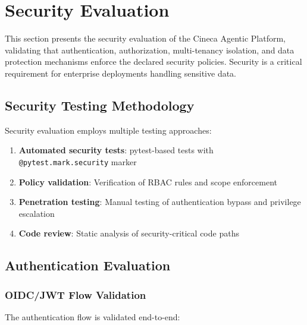 
\section{Security Evaluation}
\label{sec:security-eval}

This section presents the security evaluation of the Cineca Agentic Platform, validating that authentication, authorization, multi-tenancy isolation, and data protection mechanisms enforce the declared security policies. Security is a critical requirement for enterprise deployments handling sensitive data.

\subsection{Security Testing Methodology}

Security evaluation employs multiple testing approaches:

\begin{enumerate}
    \item \textbf{Automated security tests}: pytest-based tests with \texttt{@pytest.mark.security} marker
    \item \textbf{Policy validation}: Verification of RBAC rules and scope enforcement
    \item \textbf{Penetration testing}: Manual testing of authentication bypass and privilege escalation
    \item \textbf{Code review}: Static analysis of security-critical code paths
\end{enumerate}

\subsection{Authentication Evaluation}

\subsubsection{OIDC/JWT Flow Validation}

The authentication flow is validated end-to-end:

